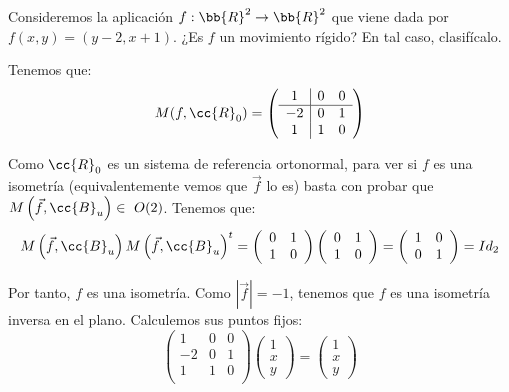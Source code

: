 \begin{ejercicio}
    Consideremos la aplicación $f : \bb{R}^2 \to \bb{R}^2$ que viene dada por $f(x, y) = (y -2, x+ 1)$.
    ¿Es $f$ un movimiento rígido? En tal caso, clasifícalo.

    Tenemos que:
    \begin{equation*}
        M(f,\cc{R}_0) = \left(
        \begin{array}{c|cc}
            1 & 0 & 0 \\ \hline
            -2 & 0 & 1 \\
            1 & 1 & 0 \\
        \end{array}
        \right)
    \end{equation*}

    Como $\cc{R}_0$ es un sistema de referencia ortonormal, para ver si $f$ es una isometría (equivalentemente vemos que $\vec{f}$ lo es) basta con probar que
    $M\left(\vec{f}, \cc{B}_u\right)\in~O(2)$. Tenemos que:
    \begin{equation*}
        M\left(\vec{f},\cc{B}_u\right)M\left(\vec{f},\cc{B}_u\right)^t
        = 
        \left(
        \begin{array}{cc}
            0 & 1 \\
            1 & 0 \\
        \end{array}
        \right)
        \left(
        \begin{array}{cc}
            0 & 1 \\
            1 & 0 \\
        \end{array}
        \right)
        = 
        \left(
        \begin{array}{cc}
            1 & 0 \\
            0 & 1 \\
        \end{array}
        \right) = Id_2
    \end{equation*}

    Por tanto, $f$ es una isometría. Como $\left|\vec{f}\right|=-1$, tenemos que $f$ es una isometría inversa en el plano. Calculemos sus puntos fijos:
    \begin{equation*}
        \left(
        \begin{array}{c|cc}
            1 & 0 & 0 \\ \hline
            -2 & 0 & 1 \\
            1 & 1 & 0 \\
        \end{array}
        \right)
        \left(
        \begin{array}{c}
            1\\x\\y
        \end{array}
        \right)
        =\left(
            \begin{array}{c}
                1\\x\\y
            \end{array}
        \right)
    \end{equation*}


\end{ejercicio}
